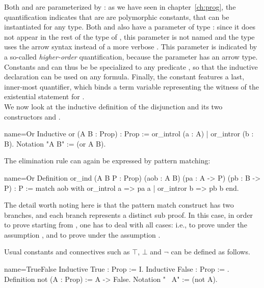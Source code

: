 Both  and  are parameterized by : as
we have seen in chapter~\ref{ch:prog}, the 
quantification indicates that  are  are polymorphic
constants, that can be instantiated for any type. Both  and
 also have a parameter of type  : since it
does not appear in the rest of the type of , this parameter is
not named and the type uses the arrow syntax instead of a more verbose
. This parameter is
indicated by a so-called \emph{higher-order} quantification, because
the parameter has an arrow type. Constants   and 
can thus be  be specialized to any predicate , so that the 
inductive declaration can be used on any formula. Finally, the
 constant features a last, inner-most 
quantifier, which binds a term variable  representing the witness
of the existential statement for .\\

We now look at the inductive definition of the disjunction 
and its two constructors  and .

\begin{coq}{name=Or}{}
Inductive or (A B : Prop) : Prop := or_introl (a : A) | or_intror (b : B).
Notation "A \/ B" := (or A B).
\end{coq}

The elimination rule can again be expressed by pattern matching:

\begin{coq}{name=Or}{}
Definition or_ind (A B P : Prop)
  (aob : A \/ B) (pa : A -> P) (pb : B -> P) : P :=
  match aob with or_introl a => pa a | or_intror b => pb b end.
\end{coq}

The detail worth noting here is that the pattern match construct has two
branches, and each branch represents a distinct sub proof.  In this
case, in order to prove  starting from ,
one has to deal with all cases: i.e., to prove  under the
assumption , and to prove 
under the assumption .

Usual constants and connectives such as $\top$, $\bot$ and $\neg$
can be defined as follows.

\begin{coq}{name=TrueFalse}{}
Inductive True : Prop := I.
Inductive False : Prop := .
Definition not (A : Prop) := A -> False.
Notation "~ A" := (not A).
\end{coq}


